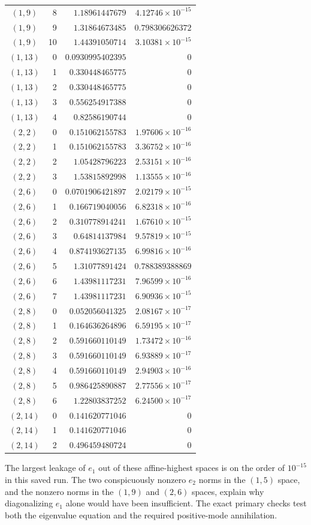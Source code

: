 \begin{longtable}{@{}crrr@{}}
$(1,9)$ & 8 & $1.18961447679$ & $4.12746\times10^{-15}$\\
$(1,9)$ & 9 & $1.31864673485$ & $0.798306626372$\\
$(1,9)$ & 10 & $1.44391050714$ & $3.10381\times10^{-15}$\\
$(1,13)$ & 0 & $0.0930995402395$ & $0$\\
$(1,13)$ & 1 & $0.330448465775$ & $0$\\
$(1,13)$ & 2 & $0.330448465775$ & $0$\\
$(1,13)$ & 3 & $0.556254917388$ & $0$\\
$(1,13)$ & 4 & $0.82586190744$ & $0$\\
$(2,2)$ & 0 & $0.151062155783$ & $1.97606\times10^{-16}$\\
$(2,2)$ & 1 & $0.151062155783$ & $3.36752\times10^{-16}$\\
$(2,2)$ & 2 & $1.05428796223$ & $2.53151\times10^{-16}$\\
$(2,2)$ & 3 & $1.53815892998$ & $1.13555\times10^{-16}$\\
$(2,6)$ & 0 & $0.0701906421897$ & $2.02179\times10^{-15}$\\
$(2,6)$ & 1 & $0.166719040056$ & $6.82318\times10^{-16}$\\
$(2,6)$ & 2 & $0.310778914241$ & $1.67610\times10^{-15}$\\
$(2,6)$ & 3 & $0.64814137984$ & $9.57819\times10^{-15}$\\
$(2,6)$ & 4 & $0.874193627135$ & $6.99816\times10^{-16}$\\
$(2,6)$ & 5 & $1.31077891424$ & $0.788389388869$\\
$(2,6)$ & 6 & $1.43981117231$ & $7.96599\times10^{-16}$\\
$(2,6)$ & 7 & $1.43981117231$ & $6.90936\times10^{-15}$\\
$(2,8)$ & 0 & $0.052056041325$ & $2.08167\times10^{-17}$\\
$(2,8)$ & 1 & $0.164636264896$ & $6.59195\times10^{-17}$\\
$(2,8)$ & 2 & $0.591660110149$ & $1.73472\times10^{-16}$\\
$(2,8)$ & 3 & $0.591660110149$ & $6.93889\times10^{-17}$\\
$(2,8)$ & 4 & $0.591660110149$ & $2.94903\times10^{-16}$\\
$(2,8)$ & 5 & $0.986425890887$ & $2.77556\times10^{-17}$\\
$(2,8)$ & 6 & $1.22803837252$ & $6.24500\times10^{-17}$\\
$(2,14)$ & 0 & $0.141620771046$ & $0$\\
$(2,14)$ & 1 & $0.141620771046$ & $0$\\
$(2,14)$ & 2 & $0.496459480724$ & $0$\\
\end{longtable}\endgroup
The largest leakage of $e_1$ out of these affine-highest spaces
is on the order of $10^{-15}$ in this saved run. The two conspicuously
nonzero $e_2$ norms in the $(1,5)$ space, and the nonzero norms in the
$(1,9)$ and $(2,6)$ spaces, explain why diagonalizing $e_1$ alone
would have been insufficient. The exact primary checks test both the
eigenvalue equation and the required positive-mode annihilation.

